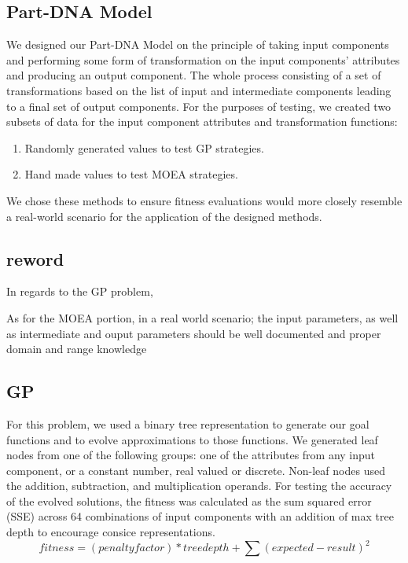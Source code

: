 \documentclass{IEEEtran}
\begin{document}
\subsection{Part-DNA Model}
We designed our Part-DNA Model on the principle of taking input components and performing some form of transformation on the input components' attributes and producing an output component. The whole process consisting of a set of transformations based on the list of input and intermediate components leading to a final set of output components. For the purposes of testing, we created two subsets of data for the input component attributes and transformation functions:
\begin{enumerate}
\item Randomly generated values to test GP strategies.
\item Hand made values to test MOEA strategies.
\end{enumerate}
We chose these methods to ensure fitness evaluations would more closely resemble a real-world scenario for the application of the designed methods.

\subsection{reword}
In regards to the GP problem,

As for the MOEA portion, in a real world scenario; the input parameters, as well as intermediate and ouput parameters should be well documented and proper domain and range knowledge

\subsection{GP}
For this problem, we used a binary tree representation to generate our goal functions and to evolve approximations to those functions. We generated leaf nodes from one of the following groups: one of the attributes from any input component, or a constant number, real valued or discrete. Non-leaf nodes used the addition, subtraction, and multiplication operands. For testing the accuracy of the evolved solutions, the fitness was calculated as the sum squared error (SSE) across 64 combinations of input components with an addition of max tree depth to encourage consice representations.
\begin{equation} \label{eq:1}
fitness=(penaltyfactor)*treedepth + \sum (expected-result)^{2}
\end{equation}
\end{document}

